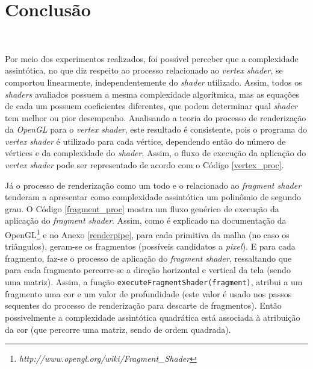 \chapter[Conclusão]{Conclusão}\

	 Por meio dos experimentos realizados, foi possível perceber que a complexidade assintótica,  no que diz respeito ao processo relacionado ao \textit{vertex shader}, se comportou linearmente, independentemente do \textit{shader} utilizado. Assim, todos os \textit{shaders} avaliados possuem a mesma complexidade algorítmica, mas as equações de cada um possuem coeficientes diferentes, que podem determinar qual \textit{shader} tem melhor ou pior desempenho. Analisando a teoria do processo de renderização da \textit{OpenGL} para o \textit{vertex shader}, este resultado é consistente, pois o programa do \textit{vertex shader} é utilizado para cada vértice, dependendo então do número de vértices e da complexidade do \textit{shader}.  Assim, o fluxo de execução da aplicação do \textit{vertex shader} pode ser representado de acordo com o Código \ref{vertex_proc}.

	 

	Já o processo de renderização como um todo e o relacionado ao \textit{fragment shader} tenderam a apresentar como complexidade assintótica um polinômio de segundo grau. O Código \ref{fragment_proc} mostra um fluxo genérico de execução da aplicação do \textit{fragment shader}. Assim, como é explicado na documentação da OpenGL\footnote{\textit{http://www.opengl.org/wiki/Fragment\_Shader}} e no Anexo \ref{renderpipe}, para cada primitiva da malha (no caso os triângulos), geram-se os fragmentos (possíveis candidatos a \textit{pixel}). E para cada fragmento, faz-se o processo de aplicação do \textit{fragment shader}, ressaltando que para cada fragmento percorre-se a direção horizontal e vertical da tela (sendo uma matriz). Assim, a função \texttt{executeFragmentShader(fragment)}, atribui a um fragmento uma cor e um valor de profundidade (este valor é usado nos passos sequentes do processo de renderização para descarte de fragmentos). Então possivelmente a complexidade assintótica quadrática está associada à atribuição da cor (que percorre uma matriz, sendo de ordem quadrada). 

	 

